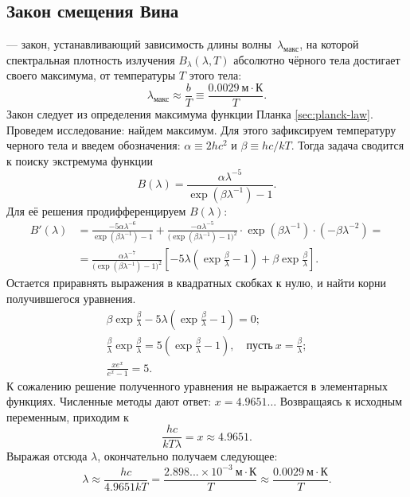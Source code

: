 \subsection{Закон смещения Вина}
 --- закон, устанавливающий зависимость длины волны~$\lambda_\text{макс}$, на которой спектральная плотность излучения $B_\lambda(\lambda, T)$ абсолютно чёрного тела достигает своего максимума, от температуры $T$ этого тела:
\begin{equation}
    \lambda_\text{макс} \approx \frac{b}{T} \equiv \frac{0.0029~\text{м} \cdot \text{К}}{T}.
\end{equation}
Закон следует из определения максимума функции Планка \eqref{sec:planck-law}.
Проведем исследование: найдем максимум. Для этого зафиксируем температуру черного тела и введем обозначения: $\alpha \equiv 2 h c^2$ и $\beta \equiv h c / k T$. Тогда задача сводится к поиску экстремума функции
\begin{equation*}
    B(\lambda) = \frac{\alpha \lambda^{-5}}{\exp \left(\beta \lambda^{-1} \right) - 1}.
\end{equation*}
Для её решения продифференцируем $B(\lambda)$:
\begin{align*}
    B'(\lambda) &= \frac{-5 \alpha \lambda^{-6}}{\exp \left(\beta \lambda^{-1} \right) - 1} + \frac{-\alpha \lambda^{-5}}{\big(\exp \left(\beta \lambda^{-1} \right) - 1\big)^2} \cdot \exp \left( \beta \lambda^{-1} \right) \cdot \left(-\beta \lambda^{-2}\right) = \\
    &= \frac{\alpha \lambda^{-7}}{\big(\exp \left(\beta \lambda^{-1} \right) - 1\big)^2} \left[ -5\lambda \left( \exp \frac{\beta}{\lambda} - 1 \right) + \beta \exp \frac{\beta}{\lambda} \right].
\end{align*}
Остается приравнять выражения в квадратных скобках к нулю, и найти корни получившегося уравнения.
\begin{gather*}
    \beta \exp \frac{\beta}{\lambda} - 5\lambda \left( \exp \frac{\beta}{\lambda} - 1 \right) = 0;\\
    \frac{\beta}{\lambda} \exp \frac{\beta}{\lambda} = 5 \left( \exp \frac{\beta}{\lambda} - 1 \right),\quad\text{пусть}~x = \frac{\beta}{\lambda};\\
    \frac{x e^x}{e^x - 1} = 5.
\end{gather*}
К сожалению решение полученного уравнения не выражается в элементарных функциях. Численные методы дают ответ: $x = 4.9651\ldots$ Возвращаясь к исходным переменным, приходим к
\begin{equation*}
    \frac{h c}{k T \lambda} = x \approx 4.9651.
\end{equation*}
Выражая отсюда $\lambda$, окончательно получаем следующее:
\begin{equation*}
    \lambda \approx \frac{h c}{4.9651 k T} = \frac{2.898... \times 10^{-3}~\text{м}\cdot\text{К}}{T} \approx  \frac{0.0029~\text{м} \cdot \text{К}}{T}.
\end{equation*}

